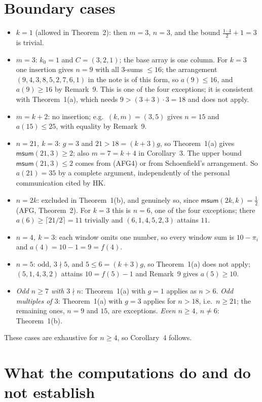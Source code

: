 \documentclass[11pt]{amsart}
\theoremstyle{remark}
\newcommand{\msum}{\mathsf{msum}}
\begin{document}
\section{Boundary cases}

\begin{itemize}
\item \emph{$k=1$} (allowed in Theorem~2): then $m=3$, $n=3$, and the bound $\frac{1\cdot4}2+1=3$ is trivial.
\item \emph{$m=3$}: $k_0=1$ and $C=(3,2,1)$; the base array is one column. For $k=3$ one insertion gives $n=9$ with
all $3$-sums $\le16$; the arrangement $(9,4,3,8,5,2,7,6,1)$ in the note is of this form, so $a(9)\le16$, and
$a(9)\ge16$ by Remark~9. This is one of the four exceptions; it is consistent with Theorem~1(a), which needs
$9>(3+3)\cdot3=18$ and does not apply.
\item \emph{$m=k+2$}: no insertion; e.g.\ $(k,m)=(3,5)$ gives $n=15$ and $a(15)\le25$, with equality by Remark~9.
\item \emph{$n=21$, $k=3$}: $g=3$ and $21>18=(k+3)g$, so Theorem~1(a) gives $\msum(21,3)\ge2$; also $m=7=k+4$ in
Corollary~3. The upper bound $\msum(21,3)\le2$ comes from (AFG4) or from Schoenfield's arrangement. So $a(21)=35$
by a complete argument, independently of the personal communication cited by HK.
\item \emph{$n=2k$}: excluded in Theorem~1(b), and genuinely so, since $\msum(2k,k)=\frac12$ (AFG, Theorem~2). For
$k=3$ this is $n=6$, one of the four exceptions; there $a(6)\ge\lceil21/2\rceil=11$ trivially and
$(6,1,4,5,2,3)$ attains $11$.
\item \emph{$n=4$, $k=3$}: each window omits one number, so every window sum is $10-\pi_i$ and $a(4)=10-1=9=f(4)$.
\item \emph{$n=5$}: odd, $3\nmid5$, and $5\le6=(k+3)g$, so Theorem~1(a) does not apply; $(5,1,4,3,2)$ attains
$10=f(5)-1$ and Remark~9 gives $a(5)\ge10$.
\item \emph{Odd $n\ge7$ with $3\nmid n$}: Theorem~1(a) with $g=1$ applies as $n>6$. \emph{Odd multiples of $3$}:
Theorem~1(a) with $g=3$ applies for $n>18$, i.e.\ $n\ge21$; the remaining ones, $n=9$ and $15$, are exceptions.
\emph{Even $n\ge4$, $n\ne6$}: Theorem~1(b).
\end{itemize}
These cases are exhaustive for $n\ge4$, so Corollary~4 follows.

\section{What the computations do and do not establish}
\end{document}
